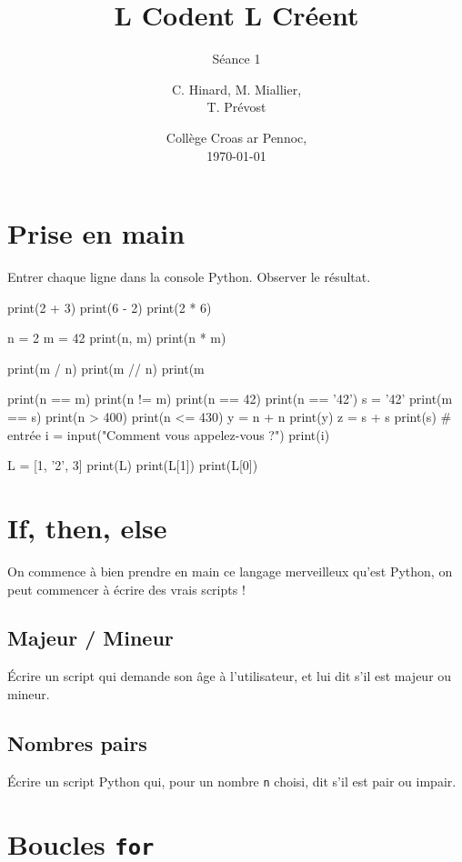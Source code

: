 \documentclass[12pt,a4paper, oneside]{article}
\title[LCLC -- Séance 1]{\og L Codent L Créent \fg{}}
\subtitle{Séance 1}
\author{C. Hinard, M. Miallier, \\T. Prévost}
\date{Collège Croas ar Pennoc,\\ \today}
\begin{document}
\maketitle

\section*{Prise en main}\label{sec:prise-en-main}
  Entrer chaque ligne dans la console Python.
  Observer le résultat.
  \begin{pyverbatim}

    print(2 + 3)
    print(6 - 2)
    print(2 * 6)

    n = 2
    m = 42
    print(n, m)
    print(n * m)

    print(m / n)
    print(m // n)
    print(m %

    print(n == m)
    print(n != m)
    print(n == 42)
    print(n == '42')
    s = '42'
    print(m == s)
    print(n > 400)
    print(n <= 430)
    y = n + n
    print(y)
    z = s + s
    print(s)
    # entrée
    i = input("Comment vous appelez-vous ?")
    print(i)

    L = [1, '2', 3]
    print(L)
    print(L[1])
    print(L[0])
  \end{pyverbatim}

  \section{If, then, else}\label{sec:if-then-else}
  On commence à bien prendre en main ce langage merveilleux qu'est Python, on peut commencer à écrire des vrais scripts !
  \subsection{Majeur / Mineur}\label{subsec:majeur-/-mineur}
    Écrire un script qui demande son âge à l'utilisateur, et lui dit s'il est majeur ou mineur.

  \subsection{Nombres pairs}\label{subsec:nombres-pairs}
    Écrire un script Python qui, pour un nombre \texttt{n} choisi, dit s'il est pair ou impair.

  \section{Boucles \texttt{for}}\label{sec:bouclesfor}
\end{document}
